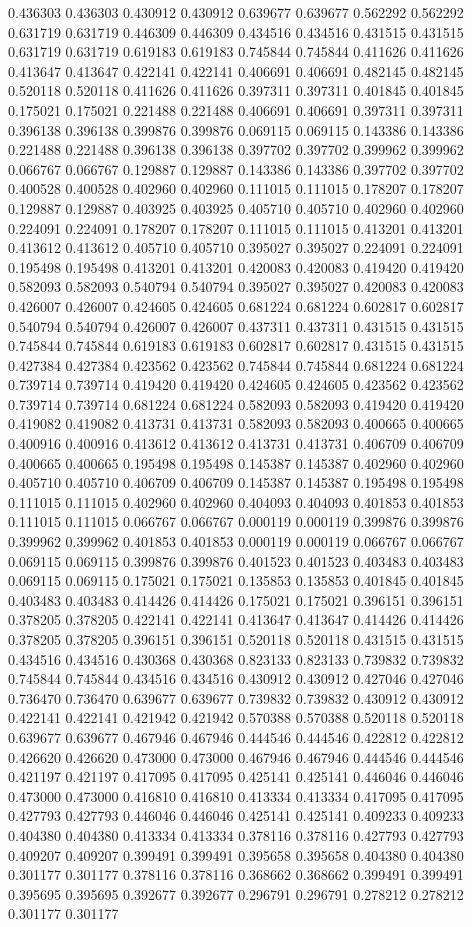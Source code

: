 0.436303 0.436303 0.430912 0.430912 0.639677 0.639677 0.562292 0.562292 0.631719 0.631719 0.446309 0.446309 0.434516 0.434516 0.431515 0.431515 0.631719 0.631719 0.619183 0.619183 0.745844 0.745844 0.411626 0.411626 0.413647 0.413647 0.422141 0.422141 0.406691 0.406691 0.482145 0.482145 0.520118 0.520118 0.411626 0.411626 0.397311 0.397311 0.401845 0.401845 0.175021 0.175021 0.221488 0.221488 0.406691 0.406691 0.397311 0.397311 0.396138 0.396138 0.399876 0.399876 0.069115 0.069115 0.143386 0.143386 0.221488 0.221488 0.396138 0.396138 0.397702 0.397702 0.399962 0.399962 0.066767 0.066767 0.129887 0.129887 0.143386 0.143386 0.397702 0.397702 0.400528 0.400528 0.402960 0.402960 0.111015 0.111015 0.178207 0.178207 0.129887 0.129887 0.403925 0.403925 0.405710 0.405710 0.402960 0.402960 0.224091 0.224091 0.178207 0.178207 0.111015 0.111015 0.413201 0.413201 0.413612 0.413612 0.405710 0.405710 0.395027 0.395027 0.224091 0.224091 0.195498 0.195498 0.413201 0.413201 0.420083 0.420083 0.419420 0.419420 0.582093 0.582093 0.540794 0.540794 0.395027 0.395027 0.420083 0.420083 0.426007 0.426007 0.424605 0.424605 0.681224 0.681224 0.602817 0.602817 0.540794 0.540794 0.426007 0.426007 0.437311 0.437311 0.431515 0.431515 0.745844 0.745844 0.619183 0.619183 0.602817 0.602817 0.431515 0.431515 0.427384 0.427384 0.423562 0.423562 0.745844 0.745844 0.681224 0.681224 0.739714 0.739714 0.419420 0.419420 0.424605 0.424605 0.423562 0.423562 0.739714 0.739714 0.681224 0.681224 0.582093 0.582093 0.419420 0.419420 0.419082 0.419082 0.413731 0.413731 0.582093 0.582093 0.400665 0.400665 0.400916 0.400916 0.413612 0.413612 0.413731 0.413731 0.406709 0.406709 0.400665 0.400665 0.195498 0.195498 0.145387 0.145387 0.402960 0.402960 0.405710 0.405710 0.406709 0.406709 0.145387 0.145387 0.195498 0.195498 0.111015 0.111015 0.402960 0.402960 0.404093 0.404093 0.401853 0.401853 0.111015 0.111015 0.066767 0.066767 0.000119 0.000119 0.399876 0.399876 0.399962 0.399962 0.401853 0.401853 0.000119 0.000119 0.066767 0.066767 0.069115 0.069115 0.399876 0.399876 0.401523 0.401523 0.403483 0.403483 0.069115 0.069115 0.175021 0.175021 0.135853 0.135853 0.401845 0.401845 0.403483 0.403483 0.414426 0.414426 0.175021 0.175021 0.396151 0.396151 0.378205 0.378205 0.422141 0.422141 0.413647 0.413647 0.414426 0.414426 0.378205 0.378205 0.396151 0.396151 0.520118 0.520118 0.431515 0.431515 0.434516 0.434516 0.430368 0.430368 0.823133 0.823133 0.739832 0.739832 0.745844 0.745844 0.434516 0.434516 0.430912 0.430912 0.427046 0.427046 0.736470 0.736470 0.639677 0.639677 0.739832 0.739832 0.430912 0.430912 0.422141 0.422141 0.421942 0.421942 0.570388 0.570388 0.520118 0.520118 0.639677 0.639677 0.467946 0.467946 0.444546 0.444546 0.422812 0.422812 0.426620 0.426620 0.473000 0.473000 0.467946 0.467946 0.444546 0.444546 0.421197 0.421197 0.417095 0.417095 0.425141 0.425141 0.446046 0.446046 0.473000 0.473000 0.416810 0.416810 0.413334 0.413334 0.417095 0.417095 0.427793 0.427793 0.446046 0.446046 0.425141 0.425141 0.409233 0.409233 0.404380 0.404380 0.413334 0.413334 0.378116 0.378116 0.427793 0.427793 0.409207 0.409207 0.399491 0.399491 0.395658 0.395658 0.404380 0.404380 0.301177 0.301177 0.378116 0.378116 0.368662 0.368662 0.399491 0.399491 0.395695 0.395695 0.392677 0.392677 0.296791 0.296791 0.278212 0.278212 0.301177 0.301177 
